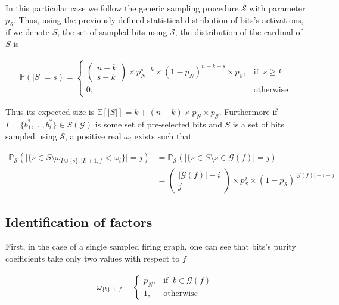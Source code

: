 \documentclass[a4paper, 11pt]{article}
\begin{document}
In this particular case we follow the generic sampling procedure $\mathcal{S}$ with parameter $p_{\mathcal{S}}$. Thus, using the previously defined statistical distribution of bits's activations, if we denote $S$, the set of sampled bits using $\mathcal{S}$, the distribution of the cardinal of $S$ is 

\begin{align*}
\mathbb{P}\left(\vert S \vert = s\right) = \begin{cases} \begin{pmatrix} n - k \\ s - k  \end{pmatrix} \times p_N^{s - k } \times (1 - p_N)^{n-k-s} \times p_{\mathcal{S}} , & \text{if }\ s \geq k \\ 0, & \text{otherwise} \end{cases}
\end{align*}

Thus its expected size is $\mathbb{E}\left[ \vert S \vert \right] = k + (n - k) \times p_N \times p_{\mathcal{S}} $. Furthermore if $I= \{b_1^{*}, \ldots, b_i^{*} \}\in S(\mathcal{G})$ is some set of pre-selected bits and $S$ is a set of bits sampled using $\mathcal{S}$, a positive real $\omega_i$ exists such that

\begin{align*}
\mathbb{P}_{\mathcal{S}} \left( \vert \lbrace s \in S \setminus \omega_{I \cup \{s\}, \vert I \vert + 1, f } < \omega_i \rbrace \vert = j \right)  &= \mathbb{P}_{\mathcal{S}} \left( \vert \lbrace s \in S \setminus s\in \mathcal{G}(f) \vert = j \right)\\
&= \begin{pmatrix} \vert \mathcal{G}(f) \vert -i \\ j  \end{pmatrix} \times p_{\mathcal{S}}^{j} \times (1 - p_{\mathcal{S}})^{\vert \mathcal{G}(f) \vert -i - j}
\end{align*}

\subsection{Identification of factors}

First, in the case of a single sampled firing graph, one can see that bits's purity coefficients take only two values with respect to $f$

\begin{align*}
\omega_{\{b\}, 1, f} = \begin{cases} p_N , & \text{if }\ b \in \mathcal{G}(f) \\ 1, & \text{otherwise} \end{cases}
\end{align*}
\end{document}
